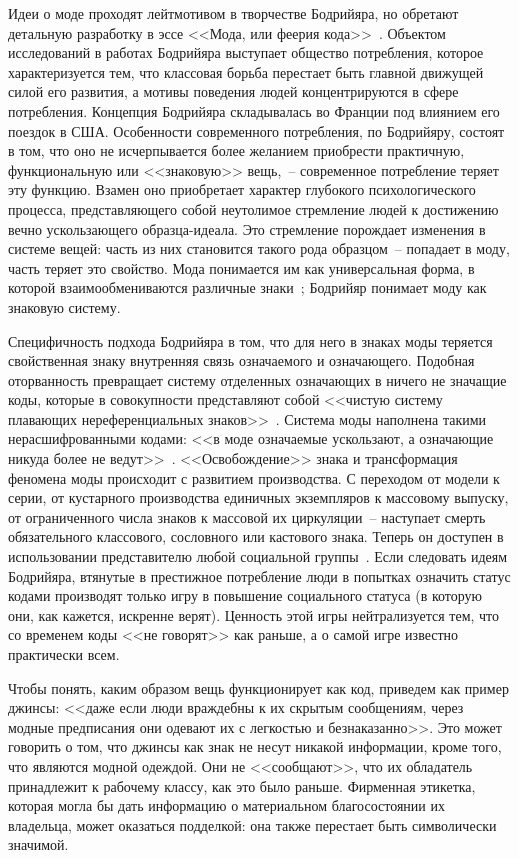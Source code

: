   Идеи о моде проходят лейтмотивом в творчестве Бодрийяра, но обретают детальную
  разработку в эссе <<Мода, или феерия кода>>~\cite{bib:4}. Объектом
  исследований в работах Бодрийяра выступает общество потребления, которое
  характеризуется тем, что классовая борьба перестает быть главной движущей
  силой его развития, а мотивы поведения людей концентрируются в сфере
  потребления. Концепция Бодрийяра складывалась во Франции под влиянием его
  поездок в США. Особенности современного потребления, по Бодрийяру, состоят в
  том, что оно не исчерпывается более желанием приобрести практичную,
  функциональную или <<знаковую>> вещь,~-- современное потребление теряет эту
  функцию. Взамен оно приобретает характер глубокого психологического процесса,
  представляющего собой неутолимое стремление людей к достижению вечно
  ускользающего образца-идеала. Это стремление порождает изменения в системе
  вещей: часть из них становится такого рода образцом~-- попадает в моду, часть
  теряет это свойство. Мода понимается им как универсальная форма, в которой
  взаимообмениваются различные знаки~\cite{bib:5}; Бодрийяр понимает моду как
  знаковую систему.
  
  Специфичность подхода Бодрийяра в том, что для него в знаках моды теряется
  свойственная знаку внутренняя связь означаемого и означающего. Подобная
  оторванность превращает систему отделенных означающих в ничего не значащие
  коды, которые в совокупности представляют собой <<чистую систему плавающих
  нереференциальных знаков>>~\cite{bib:4}. Система моды наполнена такими
  нерасшифрованными кодами: <<в моде означаемые ускользают, а означающие никуда
  более не ведут>>~\cite{bib:5}. <<Освобождение>> знака и трансформация феномена
  моды происходит с развитием производства. С переходом от модели к серии, от
  кустарного производства единичных экземпляров к массовому выпуску, от
  ограниченного числа знаков к массовой их циркуляции~-- наступает смерть
  обязательного классового, сословного или кастового знака. Теперь он доступен в
  использовании представителю любой социальной группы~\cite{bib:4}. Если
  следовать идеям Бодрийяра, втянутые в престижное потребление люди в попытках
  означить статус кодами производят только игру в повышение социального статуса
  (в которую они, как кажется, искренне верят). Ценность этой игры
  нейтрализуется тем, что со временем коды <<не говорят>> как раньше, а о самой
  игре известно практически всем.
    
  Чтобы понять, каким образом вещь функционирует как код, приведем как пример
  джинсы: <<даже если люди враждебны к их скрытым сообщениям, через модные
  предписания они одевают их с легкостью и безнаказанно>>. Это может говорить о
  том, что джинсы как знак не несут никакой информации, кроме того, что являются
  модной одеждой. Они не <<сообщают>>, что их обладатель принадлежит к рабочему
  классу, как это было раньше. Фирменная этикетка, которая могла бы дать
  информацию о материальном благосостоянии их владельца, может оказаться
  подделкой: она также перестает быть символически значимой.
  
